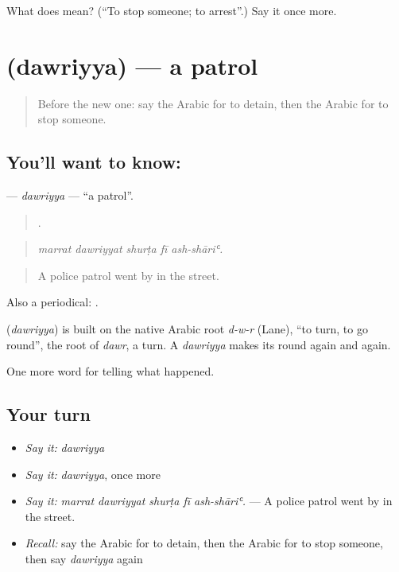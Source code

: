 \begin{tcolorbox}[breakable,colback=teal!4,colframe=teal!35!black,title={Before you move on}]
What does  mean? (\textquotedblleft{}To stop someone; to arrest\textquotedblright{}.) Say it once more.
\end{tcolorbox}
\section[\texorpdfstring{\ar{دورية} (dawriyya)}{دورية (dawriyya)}]{ (dawriyya) — a patrol}

\label{lesson:AR-C317-dawriyya}



\begin{quote}
Before the new one: say the Arabic for to detain, then the Arabic for to stop someone.
\end{quote}

\subsection*{You'll want to know: }
\textbf{} — \emph{dawriyya} — \textquotedblleft{}a patrol\textquotedblright{}.

\begin{quote}
    .
\end{quote}

\begin{quote}
\emph{marrat dawriyyat shurṭa fī ash-shāriʿ.}
\end{quote}

\begin{quote}
A police patrol went by in the street.
\end{quote}

Also a periodical:  .

\begin{cousinweb}
\textbf{} (\emph{dawriyya}) is built on the native Arabic root \emph{d-w-r} (Lane), \textquotedblleft{}to turn, to go round\textquotedblright{}, the root of \emph{dawr}, a turn. A \emph{dawriyya} makes its round again and again.
\end{cousinweb}

\begin{grammarlens}[title={What you've built}]
One more word for telling what happened.
\end{grammarlens}

\subsection*{Your turn}
\begin{itemize}
\raggedright
  \item \emph{Say it:} \emph{dawriyya}
  \item \emph{Say it:} \emph{dawriyya}, once more
  \item \emph{Say it:} \emph{marrat dawriyyat shurṭa fī ash-shāriʿ.} — A police patrol went by in the street.
  \item \emph{Recall:} say the Arabic for to detain, then the Arabic for to stop someone, then say \emph{dawriyya} again
\end{itemize}

